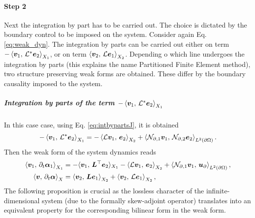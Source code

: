 \paragraph{Step 2} Next the integration by part has to be carried out. The choice is dictated by the boundary control to be imposed on the system. Consider again Eq. \eqref{eq:weak_dyn}. The integration by parts can be carried out either on term $-\inner[X_1]{\bm{v}_1}{\mathcal{L}^*\bm{e}_2}$, or on term $\inner[X_2]{\bm{v}_2}{\mathcal{L}\bm{e}_1}$. Depending o which line undergoes the integration by parts (this explains the name Partitioned Finite Element method), two structure preserving weak forms are obtained. These differ by the boundary causality imposed to the system. 


\subparagraph{Integration by parts of the term $-\inner[X_1]{\bm{v}_1}{\mathcal{L}^*\bm{e}_2}$}
In this case case, using Eq. \eqref{eq:intbypartsJ}, it is obtained 
\begin{equation}
-\inner[X_1]{\bm{v}_1}{\mathcal{L}^*\bm{e}_2} = -\inner[X_2]{\mathcal{L}\bm{v}_1}{\bm{e}_2} + \inner[L^2(\partial \Omega)]{\mathcal{N}_{\partial, 1} \bm{v}_1}{\mathcal{N}_{\partial, 2} \bm{e}_2}.
\end{equation}
Then the weak form of the system dynamics  reads 
\begin{equation}\label{eq:weak_dyn_intJ1}
\begin{aligned}
\inner[X_1]{\bm{v}_1}{\partial_t \bm{\alpha}_1} &=   -  \langle{\bm{v}_1}, \,{\bm{L}^\top \bm{e}_2}\rangle_{X_1}  -\inner[X_2]{\mathcal{L}\bm{v}_1}{\bm{e}_2} + \inner[L^2(\partial \Omega)]{\mathcal{N}_{\partial, 1} \bm{v}_1}{\bm{u}_\partial}, \\
\inner[X]{\bm{v}}{\partial_t \bm{\alpha}} &=   \inner[X_2]{\bm{v}_2}{\bm{L}\bm{e}_1} + \inner[X_2]{\bm{v}_2}{\mathcal{L}\bm{e}_1},
\end{aligned}
\end{equation}
The following proposition is crucial as the lossless character of the infinite-dimensional system (due to the formally skew-adjoint operator) translates into an equivalent property for the corresponding bilinear form in the weak form.
